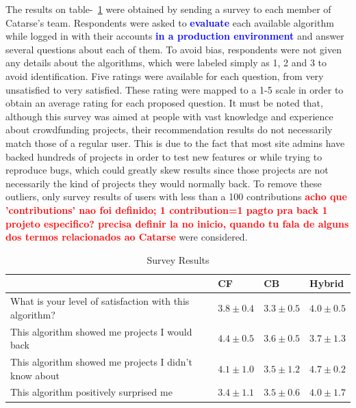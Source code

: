\documentclass[cic,tc,english]{iiufrgs}
\newcommand{\bruno}[1]{\textcolor{red}{\textbf{#1}}}
\newcommand{\adriano}[1]{\textcolor{blue}{\textbf{#1}}}
\begin{document}
The results on table-~\ref{tbl:survey-results} were obtained by sending a survey to each member of Catarse's team. Respondents were asked to \adriano{evaluate} each available algorithm while logged in with their accounts \adriano{in a production environment} and answer several questions about each of them. To avoid bias, respondents were not given any details about the algorithms, which were labeled simply as 1, 2 and 3 to avoid identification. Five ratings were available for each question, from very unsatisfied to very satisfied. These rating were mapped to a 1-5 scale in order to obtain an average rating for each proposed question. It must be noted that, although this survey was aimed at people with vast knowledge and experience about crowdfunding projects, their recommendation results do not necessarily match those of a regular user. This is due to the fact that most site admins have backed hundreds of projects in order to test new features or while trying to reproduce bugs, which could greatly skew results since those projects are not necessarily the kind of projects they would normally back. To remove these outliers, only survey results of users with less than a 100 contributions \bruno{acho que 'contributions' nao foi definido; 1 contribution=1 pagto pra back 1 projeto especifico? precisa definir la no inicio, quando tu fala de alguns dos termos relacionados ao Catarse} were considered. 
\begin{table}[ht!]
\centering
\caption{Survey Results}
\label{tbl:survey-results}
\begin{tabular}{llll}
\hline
\multicolumn{1}{|l|}{}                                                        & \multicolumn{1}{l|}{CF} & \multicolumn{1}{l|}{CB} & \multicolumn{1}{l|}{Hybrid} \\ \hline
\multicolumn{1}{|l|}{What is your level of satisfaction with this algorithm?} & \multicolumn{1}{l|}{$3.8\pm 0.4$}  & \multicolumn{1}{l|}{$3.3 \pm 0.5$}  & \multicolumn{1}{l|}{$4.0 \pm 0.5$}      \\ \hline
\multicolumn{1}{|l|}{This algorithm showed me projects I would back}          & \multicolumn{1}{l|}{$4.4 \pm 0.5$}  & \multicolumn{1}{l|}{$3.6 \pm 0.5$}  & \multicolumn{1}{l|}{$3.7 \pm 1.3$}      \\ \hline
\multicolumn{1}{|l|}{This algorithm showed me projects I didn't know about}   & \multicolumn{1}{l|}{$4.1 \pm 1.0$}  & \multicolumn{1}{l|}{$3.5 \pm 1.2$}  & \multicolumn{1}{l|}{$4.7 \pm 0.2$}      \\ \hline
\multicolumn{1}{|l|}{This algorithm positively surprised me}   & \multicolumn{1}{l|}{$3.4 \pm 1.1$}  & \multicolumn{1}{l|}{$3.5 \pm 0.6$}  & \multicolumn{1}{l|}{$4.0 \pm 1.7$}      \\ \hline
\end{tabular}
\end{table}
\end{document}
